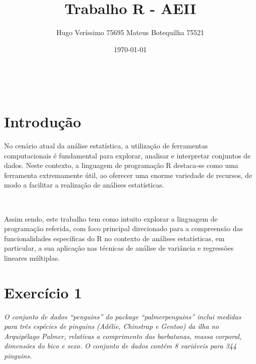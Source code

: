 \documentclass[]{article}
\title{Trabalho R - AEII}
\author{Hugo Veríssimo 75695 \newline Mateus Botequilha 75521}
\date{\today}
\begin{document}
\maketitle
\tableofcontents
{}
\clearpage

\(\ \)

\newpage

\section{Introdução}

No cenário atual da análise estatística, a utilização de ferramentas
computacionais é fundamental para explorar, analisar e interpretar
conjuntos de dados. Neste contexto, a linguagem de programação R
destaca-se como uma ferramenta extremamente útil, ao oferecer uma enorme
variedade de recursos, de modo a facilitar a realização de análises
estatísticas.

\(\ \)

Assim sendo, este trabalho tem como intuito explorar a linguagem de
programação referida, com foco principal direcionado para a compreensão
das funcionalidades específicas do R no contexto de análises
estatísticas, em particular, a sua aplicação nas técnicas de análise de
variância e regressões lineares múltiplas.

\newpage
\section{Exercício 1}

\textit{O conjunto de dados “penguins” do package “palmerpenguins” inclui medidas para
três espécies de pinguins (Adélie, Chinstrap e Gentoo) da ilha no Arquipélago Palmer,
relativas a comprimento das barbatanas, massa corporal, dimensões do bico e sexo. O
conjunto de dados contém 8 variáveis para 344 pinguins.}

\begin{Shaded}
\begin{Highlighting}[]
\end{Highlighting}
\end{Shaded}
\end{document}
